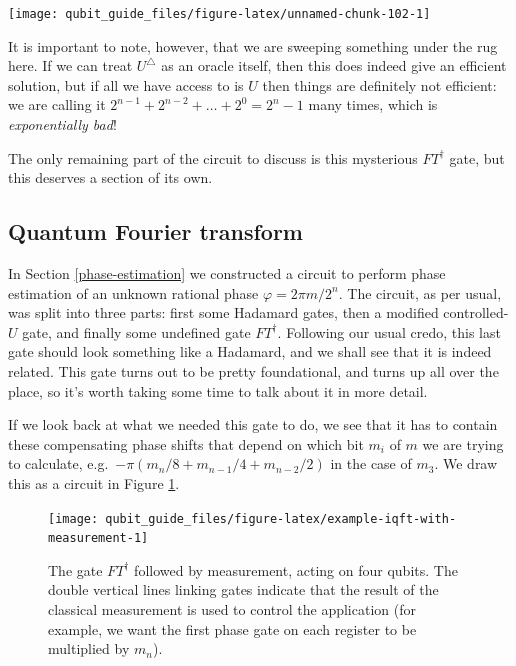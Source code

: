 \documentclass[fleqn,a4paper]{article}
\theoremstyle{definition}
\theoremstyle{definition}
\theoremstyle{definition}
\theoremstyle{definition}
\theoremstyle{remark}
\begin{document}
\begin{center}\texttt{[image: qubit\_guide\_files/figure-latex/unnamed-chunk-102-1]} \end{center}

It is important to note, however, that we are sweeping something under the rug here.
If we can treat \(U^\triangle\) as an oracle itself, then this does indeed give an efficient solution, but if all we have access to is \(U\) then things are definitely not efficient: we are calling it \(2^{n-1}+2^{n-2}+\ldots+2^0=2^n-1\) many times, which is \emph{exponentially bad}!

The only remaining part of the circuit to discuss is this mysterious \(FT^\dagger\) gate, but this deserves a section of its own.

\hypertarget{quantum-fourier-transform}{%
\subsection{Quantum Fourier transform}\label{quantum-fourier-transform}}

In Section \ref{phase-estimation} we constructed a circuit to perform phase estimation of an unknown rational phase \(\varphi=2\pi m/2^n\).
The circuit, as per usual, was split into three parts: first some Hadamard gates, then a modified controlled-\(U\) gate, and finally some undefined gate \(FT^\dagger\).
Following our usual credo, this last gate should look something like a Hadamard, and we shall see that it is indeed related.
This gate turns out to be pretty foundational, and turns up all over the place, so it's worth taking some time to talk about it in more detail.

If we look back at what we needed this gate to do, we see that it has to contain these compensating phase shifts that depend on which bit \(m_i\) of \(m\) we are trying to calculate, e.g.~\(-\pi(m_n/8+m_{n-1}/4+m_{n-2}/2)\) in the case of \(m_3\).
We draw this as a circuit in Figure \ref{fig:example-iqft-with-measurement}.



\begin{figure}[H]

{\centering \texttt{[image: qubit\_guide\_files/figure-latex/example-iqft-with-measurement-1]} 

}

\caption{The gate \(FT^\dagger\) followed by measurement, acting on four qubits. The double vertical lines linking gates indicate that the result of the classical measurement is used to control the application (for example, we want the first phase gate on each register to be multiplied by \(m_n\)).}\label{fig:example-iqft-with-measurement}
\end{figure}
\end{document}

